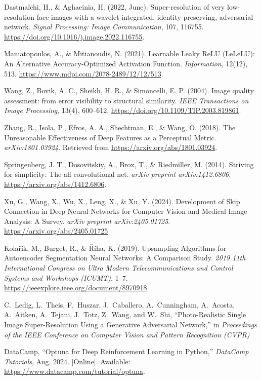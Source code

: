 \documentclass[twocolumn]{article}
\begin{document}
\begin{thebibliography}{99}
     Dastmalchi, H., \& Aghaeinia, H. (2022, June). Super-resolution of very low-resolution face images with a wavelet integrated, identity preserving, adversarial network. \textit{Signal Processing: Image Communication}, 107, 116755. \url{https://doi.org/10.1016/j.image.2022.116755}.
    
     Maniatopoulos, A., \& Mitianoudis, N. (2021). Learnable Leaky ReLU (LeLeLU): An Alternative Accuracy-Optimized Activation Function. \textit{Information}, 12(12), 513. \url{https://www.mdpi.com/2078-2489/12/12/513}.
    
     Wang, Z., Bovik, A. C., Sheikh, H. R., \& Simoncelli, E. P. (2004). Image quality assessment: from error visibility to structural similarity. \textit{IEEE Transactions on Image Processing}, 13(4), 600–612. \url{https://doi.org/10.1109/TIP.2003.819861}.
    
     Zhang, R., Isola, P., Efros, A. A., Shechtman, E., \& Wang, O. (2018). The Unreasonable Effectiveness of Deep Features as a Perceptual Metric. \textit{arXiv:1801.03924}. Retrieved from \url{https://arxiv.org/abs/1801.03924}.

     Springenberg, J. T., Dosovitskiy, A., Brox, T., \& Riedmiller, M. (2014). Striving for simplicity: The all convolutional net. \textit{arXiv preprint arXiv:1412.6806}. \url{https://arxiv.org/abs/1412.6806}.
  
     Xu, G., Wang, X., Wu, X., Leng, X., \& Xu, Y. (2024). Development of Skip Connection in Deep Neural Networks for Computer Vision and Medical Image Analysis: A Survey. \textit{arXiv preprint arXiv:2405.01725}. \url{https://arxiv.org/abs/2405.01725}

     Kolařík, M., Burget, R., \& Říha, K. (2019). Upsampling Algorithms for Autoencoder Segmentation Neural Networks: A Comparison Study. \textit{2019 11th International Congress on Ultra Modern Telecommunications and Control Systems and Workshops (ICUMT)}, 1–7. \url{https://ieeexplore.ieee.org/document/8970918}

     C.~Ledig, L.~Theis, F.~Huszar, J.~Caballero, A.~Cunningham, A.~Acosta, A.~Aitken, A.~Tejani, J.~Totz, Z.~Wang, and W.~Shi, ``Photo-Realistic Single Image Super-Resolution Using a Generative Adversarial Network,'' in \emph{Proceedings of the IEEE Conference on Computer Vision and Pattern Recognition (CVPR)}

     DataCamp, ``Optuna for Deep Reinforcement Learning in Python,'' \textit{DataCamp Tutorials}, Aug. 2024. [Online]. Available: \url{https://www.datacamp.com/tutorial/optuna}.


  \end{thebibliography}
\end{document}
